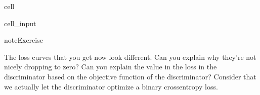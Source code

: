 \documentclass[letterpaper,10pt,english]{jupyterBook}
\begin{document}
\begin{sphinxuseclass}{cell}\begin{sphinxVerbatimInput}

\begin{sphinxuseclass}{cell_input}
\begin{sphinxVerbatim}[commandchars=\\\{\}]
 
  
  
\end{sphinxVerbatim}

\end{sphinxuseclass}\end{sphinxVerbatimInput}

\end{sphinxuseclass}
\begin{sphinxadmonition}{note}{Exercise}

\sphinxAtStartPar
The loss curves that you get now look different. Can you explain why they’re not nicely dropping to zero? Can you explain the value in the loss in the discriminator based on the objective function of the discriminator? Consider that we actually let the discriminator optimize a binary cross\sphinxhyphen{}entropy loss.
\end{sphinxadmonition}
\end{document}
